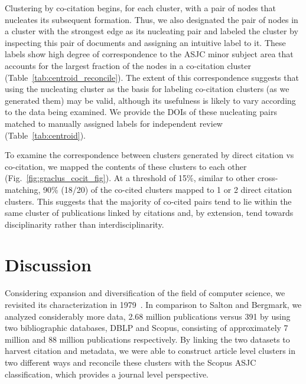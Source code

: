 Clustering by co-citation begins, for each cluster, with a pair of nodes that nucleates its subsequent formation. Thus, we also designated the pair of nodes in a cluster with the strongest edge as its nucleating pair and labeled the cluster by inspecting this pair of documents and assigning an intuitive label to it. These labels show high degree of correspondence  to the ASJC minor subject area that accounts for the largest fraction of the nodes in a co-citation cluster (Table~\ref{tab:centroid_reconcile}). 
The extent of this correspondence %
suggests that using the nucleating cluster as the basis for labeling co-citation clusters (as we generated them) may be valid, although its usefulness is likely to vary according to the data being examined. We provide the DOIs of these nucleating pairs matched to manually assigned labels for independent review (Table~\ref{tab:centroid}).

To examine the correspondence between clusters generated by direct citation vs co-citation, we mapped the contents of these clusters to each other (Fig.~\ref{fig:graclus_cocit_fig}).
 At a threshold of 15\%, similar to other cross-matching, 90\% (18/20) of the co-cited clusters mapped to 1 or 2 direct citation clusters. This suggests that the majority of co-cited pairs tend to lie within the same cluster of publications linked by citations and,  by extension, tend towards disciplinarity rather than interdisciplinarity.

\section{Discussion} Considering expansion and diversification of the field of computer science, we revisited its characterization in 1979~\cite{salton_citation_1979}. In comparison to Salton and Bergmark, we analyzed considerably more data, 2.68 million publications versus 391 by using two bibliographic databases, DBLP and Scopus, consisting of  approximately 7 million and 88 million publications respectively. By linking the two datasets to harvest citation and metadata, we were able to construct article level clusters in two different ways and reconcile these clusters with the Scopus ASJC classification, which provides a journal level perspective.

